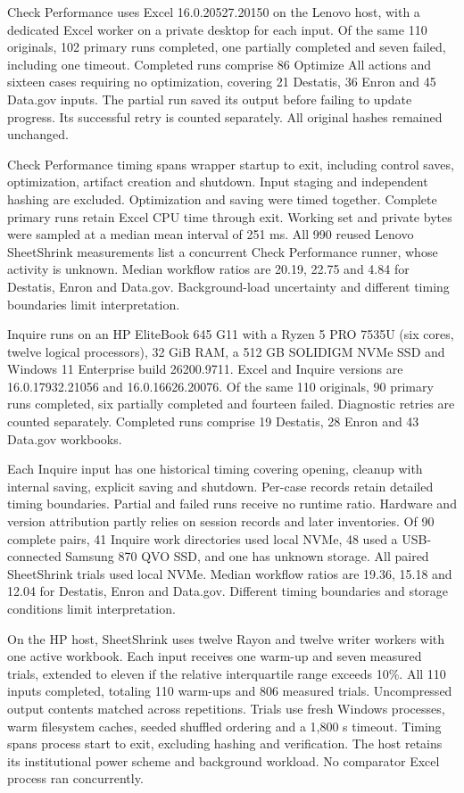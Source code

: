Check Performance uses Excel 16.0.20527.20150 on the Lenovo host, with a dedicated
Excel worker on a private desktop for each input. Of the same 110 originals, 102
primary runs completed, one partially completed and seven failed, including one
timeout. Completed runs comprise 86 Optimize All actions and sixteen cases
requiring no optimization, covering 21 Destatis, 36 Enron and 45 Data.gov inputs.
The partial run saved its output before failing to update progress. Its successful
retry is counted separately. All original hashes remained unchanged.

Check Performance timing spans wrapper startup to exit, including control saves,
optimization, artifact creation and shutdown. Input staging and independent
hashing are excluded. Optimization and saving were timed together. Complete
primary runs retain Excel CPU time through exit. Working set and private bytes
were sampled at a median mean interval of 251 ms. All 990 reused Lenovo
SheetShrink measurements list a concurrent Check Performance runner, whose
activity is unknown. Median workflow ratios are 20.19, 22.75 and 4.84 for Destatis,
Enron and Data.gov. Background-load uncertainty and different timing boundaries
limit interpretation.

Inquire runs on an HP EliteBook 645 G11 with a Ryzen 5 PRO 7535U (six cores,
twelve logical processors), 32 GiB RAM, a 512 GB SOLIDIGM NVMe SSD and Windows 11
Enterprise build 26200.9711. Excel and Inquire versions are 16.0.17932.21056 and
16.0.16626.20076. Of the same 110 originals, 90 primary runs completed, six
partially completed and fourteen failed. Diagnostic retries are counted
separately. Completed runs comprise 19 Destatis, 28 Enron and 43 Data.gov workbooks.

Each Inquire input has one historical timing covering opening, cleanup with
internal saving, explicit saving and shutdown. Per-case records retain detailed
timing boundaries. Partial and failed runs receive no runtime ratio. Hardware and
version attribution partly relies on session records and later inventories. Of
90 complete pairs, 41 Inquire work directories used local NVMe, 48 used a
USB-connected Samsung 870 QVO SSD, and one has unknown storage. All paired
SheetShrink trials used local NVMe. Median workflow ratios are 19.36, 15.18 and
12.04 for Destatis, Enron and Data.gov. Different timing boundaries and storage
conditions limit interpretation.

On the HP host, SheetShrink uses twelve Rayon and twelve writer workers with one
active workbook. Each input receives one warm-up and seven measured trials,
extended to eleven if the relative interquartile range exceeds 10\%. All 110
inputs completed, totaling 110 warm-ups and 806 measured trials. Uncompressed
output contents matched across repetitions. Trials use fresh Windows processes,
warm filesystem caches, seeded shuffled ordering and a 1,800 s timeout. Timing
spans process start to exit, excluding hashing and verification. The host retains
its institutional power scheme and background workload. No comparator Excel
process ran concurrently.

